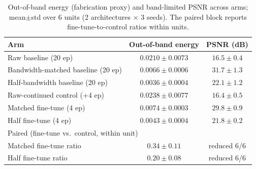 \begin{table}[t]
\centering
\small
\caption{Out-of-band energy (fabrication proxy) and band-limited PSNR across arms; mean$\pm$std over 6 units (2 architectures $\times$ 3 seeds). The paired block reports fine-tune-to-control ratios within units.}
\label{tab:main}
\begin{tabular}{lcc}
\toprule
Arm & Out-of-band energy & PSNR (dB) \\
\midrule
Raw baseline (20 ep) & $0.0210 \pm 0.0073$ & $16.5 \pm 0.4$ \\
Bandwidth-matched baseline (20 ep) & $0.0066 \pm 0.0006$ & $31.7 \pm 1.3$ \\
Half-bandwidth baseline (20 ep) & $0.0036 \pm 0.0004$ & $22.1 \pm 1.2$ \\
Raw-continued control (+4 ep) & $0.0238 \pm 0.0077$ & $16.4 \pm 0.5$ \\
Matched fine-tune (4 ep) & $0.0074 \pm 0.0003$ & $29.8 \pm 0.9$ \\
Half fine-tune (4 ep) & $0.0043 \pm 0.0004$ & $21.8 \pm 0.2$ \\
\midrule
\multicolumn{3}{l}{Paired (fine-tune vs.\ control, within unit)} \\
Matched fine-tune ratio & $0.34 \pm 0.11$ & reduced 6/6 \\
Half fine-tune ratio & $0.20 \pm 0.08$ & reduced 6/6 \\
\bottomrule
\end{tabular}
\end{table}

